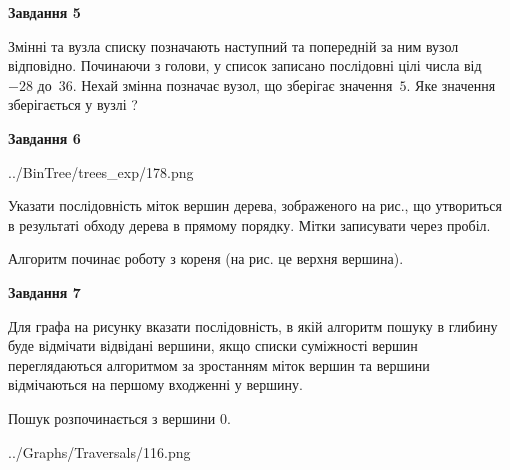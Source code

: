 \documentclass[12pt, ukrainian]{article}
\begin{document}
{\begin {large}
{\begin {center}\textbf{Завдання 5}\end {center}}\par
Змінні  та  вузла списку позначають наступний та попередній за ним вузол відповідно. Починаючи з голови, у список записано послідовні цілі числа від~$-28$ до~$36$. Нехай змінна  позначає вузол, що зберігає значення~$5$.
Яке значення зберігається у вузлі  ?\par
\newpage

{\begin {center}\textbf{Завдання 6}\end {center}}\par

\begin{center}
	{../BinTree/trees_exp/178.png}
\end{center}
Указати послідовність міток вершин дерева, зображеного на рис., що утвориться в результаті обходу дерева в прямому порядку. Мітки записувати через пробіл.\par Алгоритм починає роботу з кореня (на рис. це верхня вершина).\par
\newpage

{\begin {center}\textbf{Завдання 7}\end {center}}\par
Для графа на рисунку вказати послідовність, в якій алгоритм пошуку в глибину буде відмічати відвідані вершини, якщо списки суміжності вершин переглядаються алгоритмом за зростанням міток вершин та вершини відмічаються на першому вход\-женні у вершину.\par
Пошук розпочинається з вершини 0.\par

\begin{center}
	{../Graphs/Traversals/116.png}
\end{center}\par
\newpage


\end{large}}
\end{document}
